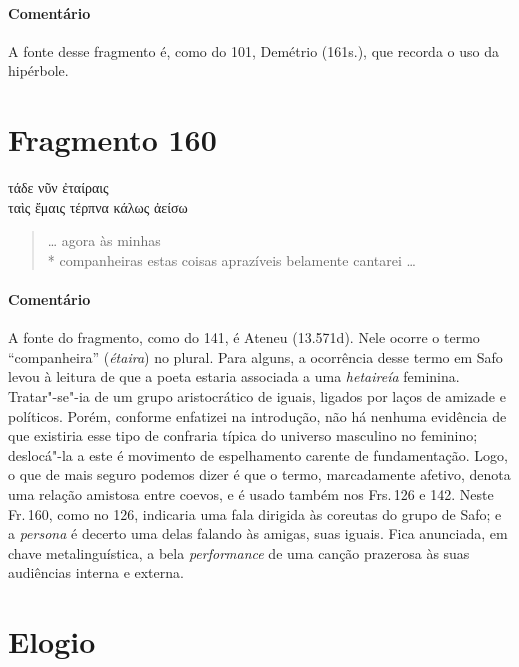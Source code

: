 {{\paragraph{Comentário} A fonte desse fragmento é, como do 101, Demétrio (161s.), que recorda o uso da
hipérbole.}


\section{Fragmento 160}

\begin{gkverse}
τάδε νῦν ἐταίραις\\
ταὶς ἔμαις \dagger{}τέρπνα\dagger{} κάλως ἀείσω
\end{gkverse}

\begin{verse}
\ldots{} agora às minhas\\*
companheiras estas coisas aprazíveis belamente cantarei \ldots{}
\end{verse}

{\paragraph{Comentário} A fonte do fragmento, como do 141, é Ateneu (13.571d). Nele ocorre o termo ``companheira” (\textit{étaira}) no plural.
Para alguns, a ocorrência desse termo em Safo levou à leitura de que a poeta estaria associada a uma \textit{hetaireía} feminina. Tratar"-se"-ia de um grupo aristocrático de iguais, ligados por laços de amizade e políticos. Porém, conforme enfatizei na introdução, não há nenhuma evidência de que existiria esse tipo de confraria típica do universo masculino no feminino; deslocá"-la a este é movimento de espelhamento carente de fundamentação. Logo, o que de mais seguro podemos dizer é que o termo, marcadamente afetivo, denota uma relação amistosa entre coevos, e é usado também nos Frs.\,126 e 142. Neste Fr.\,160, como no 126, indicaria uma fala dirigida às coreutas do grupo de Safo; e a \textit{persona} é decerto uma delas falando às amigas, suas iguais. Fica anunciada, em chave metalinguística, a bela \textit{performance}
de uma canção prazerosa às suas audiências interna e externa.}


\pagebreak
\section{Elogio}

}
